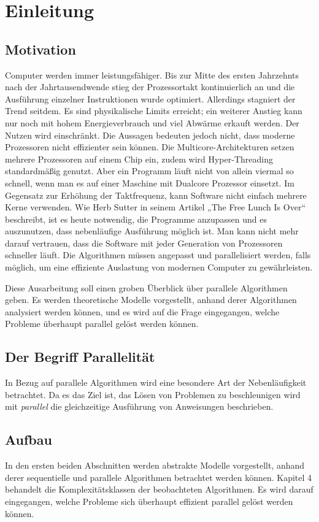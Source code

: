 \section{Einleitung}

\subsection{Motivation}
Computer werden immer leistungsfähiger.
Bis zur Mitte des ersten Jahrzehnts nach der Jahrtausendwende stieg der
Prozessortakt kontinuierlich an und die Ausführung einzelner Instruktionen
wurde optimiert.
Allerdings stagniert der Trend seitdem.
Es sind physikalische Limits erreicht; ein weiterer Anstieg kann nur noch
mit hohem Energieverbrauch und viel Abwärme erkauft werden.
Der Nutzen wird einschränkt.
Die Aussagen bedeuten jedoch nicht, dass moderne Prozessoren nicht effizienter
sein können.
Die Multicore-Architekturen setzen mehrere Prozessoren auf einem Chip ein,
zudem wird Hyper-Threading standardmäßig genutzt.
Aber ein Programm läuft nicht von allein viermal so schnell, wenn man es auf
einer Maschine mit Dualcore Prozessor einsetzt.
Im Gegensatz zur Erhöhung der Taktfrequenz, kann Software nicht einfach mehrere
Kerne verwenden.
Wie Herb Sutter in seinem Artikel „The Free Lunch Is Over“
\cite{sutterlunch} beschreibt, ist es heute notwendig, die Programme anzupassen
und es auszunutzen, dass nebenläufige Ausführung möglich ist.
Man kann nicht mehr darauf vertrauen, dass die Software mit jeder Generation
von Prozessoren schneller läuft.
Die Algorithmen müssen angepasst und parallelisiert werden, falls möglich, um
eine effiziente Auslastung von modernen Computer zu gewährleisten.

Diese Ausarbeitung soll einen groben Überblick über parallele Algorithmen geben.
Es werden theoretische Modelle vorgestellt, anhand derer Algorithmen analysiert
werden können, und es wird auf die Frage eingegangen, welche Probleme überhaupt
parallel gelöst werden können.

\subsection{Der Begriff Parallelität}
In Bezug auf parallele Algorithmen wird eine besondere Art der Nebenläufigkeit
betrachtet.
Da es das Ziel ist, das Lösen von Problemen zu beschleunigen wird mit
\emph{parallel} die gleichzeitige Ausführung von Anweisungen beschrieben.

\subsection{Aufbau}
In den ersten beiden Abschnitten werden abstrakte Modelle vorgestellt, anhand
derer sequentielle und parallele Algorithmen betrachtet werden können.
Kapitel 4 behandelt die Komplexitätsklassen der beobachteten Algorithmen.
Es wird darauf eingegangen, welche Probleme sich überhaupt effizient parallel
gelöst werden können.

